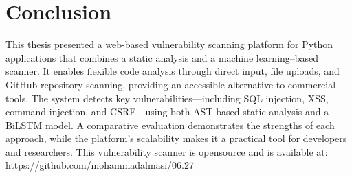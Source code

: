 \chapter{Conclusion}
\label{ch:conclusion}

This thesis presented a web-based vulnerability scanning platform for Python applications that combines a static analysis and a machine learning--based scanner. It enables flexible code analysis through direct input, file uploads, and GitHub repository scanning, providing an accessible alternative to commercial tools. The system detects key vulnerabilities---including SQL injection, XSS, command injection, and CSRF---using both AST-based static analysis and a BiLSTM model. A comparative evaluation demonstrates the strengths of each approach, while the platform's scalability makes it a practical tool for developers and researchers. This vulnerability scanner is opensource and is available at: https://github.com/mohammadalmasi/06.27
